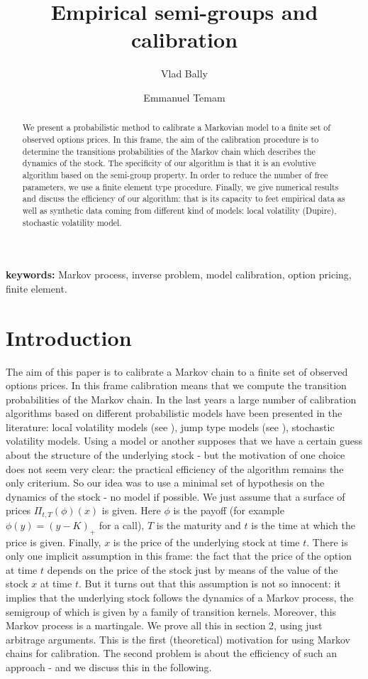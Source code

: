 \documentclass[a4paper]{article}
\author{Vlad Bally \and Emmanuel Temam}
\title{Empirical semi-groups and calibration}
\begin{document}
\maketitle
\begin{abstract}
We present a probabilistic method to calibrate a Markovian model
to a finite set of observed options prices. In this frame, the aim
of the calibration procedure is to determine the transitions
probabilities of the Markov chain which describes the dynamics of
the stock. The specificity of our algorithm is that it is an
evolutive algorithm based on the semi-group property. In order to
reduce the number of free parameters, we use a finite element type
procedure. Finally, we give numerical results and discuss the
efficiency of our algorithm: that is its capacity to feet
empirical data as well as synthetic data coming from different
kind of models: local volatility (Dupire), stochastic volatility
model. \end{abstract}

{\bf keywords: }Markov process, inverse problem, model
calibration, option pricing, finite element.

\section{Introduction}

The aim of this paper is to calibrate a Markov chain to a finite
set of observed options prices. In this frame calibration means
that we compute the transition probabilities of the Markov chain.
In the last years a large number of calibration algorithms based
on different probabilistic models have been presented in the
literature: local volatility models (see \cite{Dup,Dup2}), jump
type models (see \cite{AA}), stochastic volatility models. Using a
model or another supposes that we have a certain guess about the
structure of the underlying stock - but the motivation of one
choice does not seem very clear: the practical efficiency of the
algorithm remains the only criterium. So our idea was to use a
minimal set of hypothesis on the dynamics of the stock - no model
if possible. We just assume that a surface of prices $\Pi
_{t,T}(\phi )(x)$ is given. Here $\phi$ is the payoff (for example
$\phi (y)=(y-K)_{+}$ for a call), $T$ is the maturity and $t$ is
the time at which the price is given. Finally, $x$ is the price of
the underlying stock at time $t$. There is only one implicit
assumption in this frame: the fact that the price of the option at
time $t$ depends on the price of the stock just by means of the
value of the stock $x$ at time $t.$ But it turns out that this
assumption is not so innocent: it implies that the underlying
stock follows the dynamics of a Markov process, the semigroup of
which is given by a family of transition kernels. Moreover, this
Markov process is a martingale. We prove all this in section 2,
using just arbitrage arguments. This is the first (theoretical)
motivation for using Markov chains for calibration. The second
problem is about the efficiency of such an approach - and we
discuss this in the following.
\end{document}
